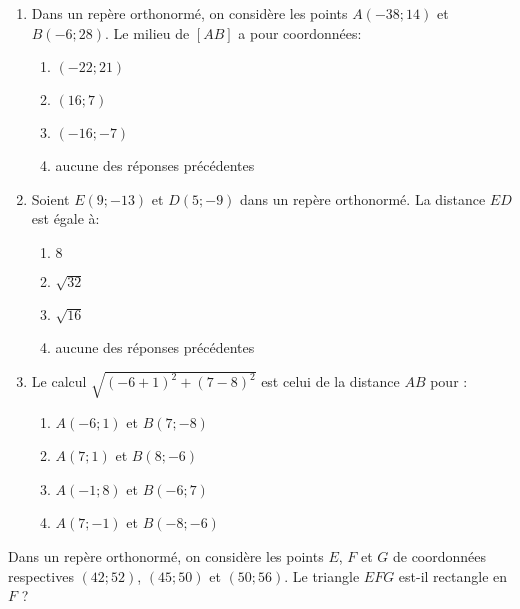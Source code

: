 \documentclass[a4paper]{article}
\begin{document}
\begin{enumerate}[resume]
  \item Dans un repère orthonormé, on considère les points $A(-38;14)$ et $B(-6;28)$. Le milieu de $[AB]$ a pour coordonnées:
    \begin{multicols}{4}
      \begin{enumerate}
	\item $(-22;21)$
	\item $(16;7)$
	\item $(-16;-7)$
	\item aucune des réponses précédentes
      \end{enumerate}
    \end{multicols}
  \item Soient $E(9;-13)$ et $D(5;-9)$ dans un repère orthonormé. La distance $ED$ est égale à:
    \begin{multicols}{4}
      \begin{enumerate}
	\item $8$
	\item $\sqrt{32}$
	\item $\sqrt{16}$
	\item aucune des réponses précédentes
      \end{enumerate}
    \end{multicols}
  \item Le calcul $\sqrt{(-6+1)^{2}+(7-8)^{2}}$ est celui de la distance $AB$ pour :
    \begin{multicols}{2}
      \begin{enumerate}
	\item $A(-6;1)$ et $B(7;-8)$
	\item $A(7;1)$ et $B(8;-6)$
	\item $A(-1;8)$ et $B(-6;7)$
	\item $A(7;-1)$ et $B(-8;-6)$
      \end{enumerate}
    \end{multicols}
\end{enumerate}

\bigskip

\exo[4 points] Dans un repère orthonormé, on considère les points $E$, $F$ et $G$ de coordonnées respectives $(42;52)$, $(45;50)$ et $(50;56)$. Le triangle $EFG$ est-il rectangle en $F$ ?

\pagebreak
\end{document}
